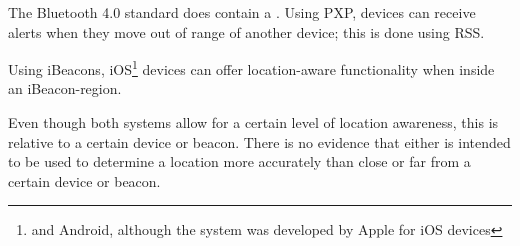 The Bluetooth 4.0 standard does contain a .
Using PXP, devices can receive alerts when they move out of range of another device; this is done using RSS.

Using iBeacons, iOS\footnote{and Android, although the system was developed by Apple for iOS devices} devices can offer location-aware functionality when inside an iBeacon-region.

Even though both systems allow for a certain level of location awareness, this is relative to a certain device or beacon.
There is no evidence that either is intended to be used to determine a location more accurately than close or far from a certain device or beacon.

